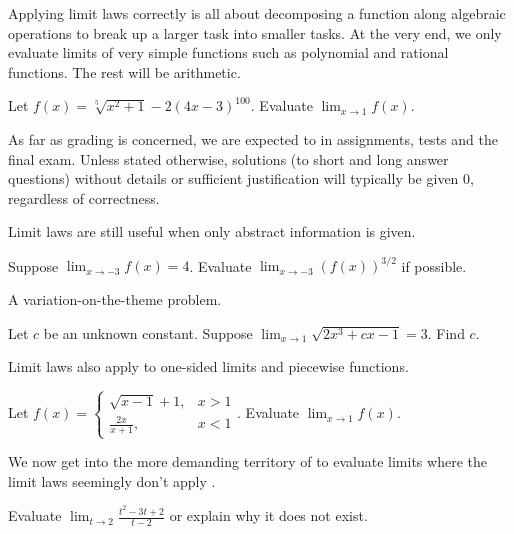 \documentclass[../main.tex]{subfiles}
\begin{document}
  \clearpage

  Applying limit laws correctly is all about decomposing a function along algebraic operations to break up a larger task into smaller tasks. At the very end, we only evaluate limits of very simple functions such as polynomial and rational functions. The rest will be arithmetic.
  \begin{example}
    Let \(f(x) = \sqrt[5]{x^{2} + 1} - 2 (4x - 3)^{100}\). Evaluate \(\lim_{x \to 1} f(x)\).
  \end{example}
  \faExclamationTriangle{} As far as grading is concerned, we are expected to  in assignments, tests and the final exam.  Unless stated otherwise, solutions (to short and long answer questions) without details or sufficient justification will typically be given \(0\), regardless of correctness. 

  Limit laws are still useful when only abstract information is given.
  \begin{example}
    Suppose \(\lim_{x \to -3} f(x) = 4\). Evaluate \(\lim_{x \to -3} \left( f(x) \right)^{3/2}\) if possible.
  \end{example}

  A variation-on-the-theme problem.  
  \begin{example}
    Let \(c\) be an unknown constant. Suppose \(\lim_{x \to 1} \sqrt{2x^{3} + cx - 1} = 3\). Find \(c\).
  \end{example}

  \faLightbulb{} Limit laws also apply to one-sided limits and piecewise functions.
  \begin{example}
    Let \(f(x) = \begin{cases}\sqrt{x - 1} + 1, &x > 1\\[1ex]\frac{2x}{x + 1}, &x < 1\end{cases}\). Evaluate \(\lim_{x \to 1} f(x)\).
  \end{example}

  We now get into the more demanding territory of  to evaluate limits where the limit laws seemingly don't apply .

  \begin{example} \label{ex:limit-cancellation}
    Evaluate \(\lim_{t \to 2} \frac{t^{2} - 3t + 2}{t - 2}\) or explain why it does not exist.
  \end{example}
\end{document}

